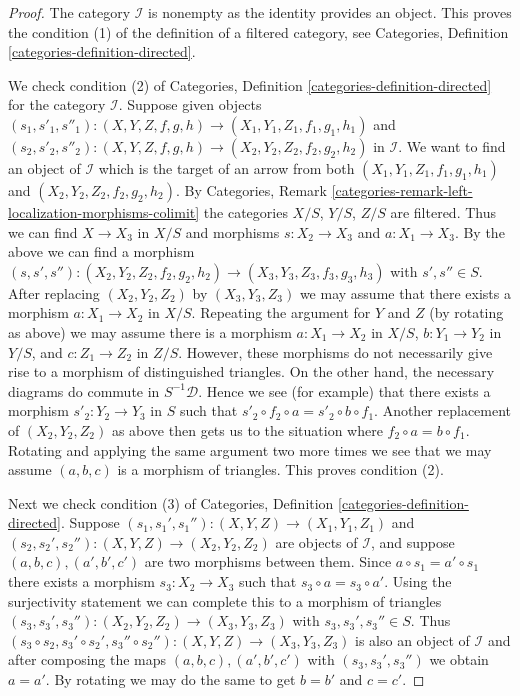 \begin{proof}
\medskip\noindent
The category $\mathcal{I}$ is nonempty as the identity provides an object.
This proves the condition (1) of the definition of a filtered category, see
Categories, Definition \ref{categories-definition-directed}.

\medskip\noindent
We check condition (2) of
Categories, Definition \ref{categories-definition-directed}
for the category $\mathcal{I}$. Suppose given objects
$(s_1, s'_1, s''_1) : (X, Y, Z, f, g, h) \to (X_1, Y_1, Z_1, f_1, g_1, h_1)$
and
$(s_2, s'_2, s''_2) : (X, Y, Z, f, g, h) \to (X_2, Y_2, Z_2, f_2, g_2, h_2)$
in $\mathcal{I}$. We want to find an object of $\mathcal{I}$
which is the target of an arrow from both
$(X_1, Y_1, Z_1, f_1, g_1, h_1)$ and $(X_2, Y_2, Z_2, f_2, g_2, h_2)$.
By Categories, Remark
\ref{categories-remark-left-localization-morphisms-colimit}
the categories $X/S$, $Y/S$, $Z/S$ are filtered.
Thus we can find $X \to X_3$ in $X/S$ and morphisms
$s : X_2 \to X_3$ and $a : X_1 \to X_3$. By the above we can find a morphism
$(s, s', s'') : (X_2, Y_2, Z_2, f_2, g_2, h_2) \to
(X_3, Y_3, Z_3, f_3, g_3, h_3)$ with $s', s'' \in S$.
After replacing $(X_2, Y_2, Z_2)$ by $(X_3, Y_3, Z_3)$ we may
assume that there exists a morphism $a : X_1 \to X_2$ in $X/S$.
Repeating the argument for $Y$ and $Z$ (by rotating as above)
we may assume there is a morphism
$a : X_1 \to X_2$ in $X/S$,
$b : Y_1 \to Y_2$ in $Y/S$, and
$c : Z_1 \to Z_2$ in $Z/S$.
However, these morphisms do not necessarily give rise to a morphism of
distinguished triangles. On the other hand, the necessary diagrams
do commute in $S^{-1}\mathcal{D}$. Hence we see (for example) that
there exists a morphism $s'_2 : Y_2 \to Y_3$ in $S$ such that
$s'_2 \circ f_2 \circ a = s'_2 \circ b \circ f_1$. Another replacement
of $(X_2, Y_2, Z_2)$ as above then gets us to the situation where
$f_2 \circ a = b \circ f_1$. Rotating and applying the same argument
two more times we see that we may assume $(a, b, c)$ is a morphism
of triangles. This proves condition (2).

\medskip\noindent
Next we check condition (3) of
Categories, Definition \ref{categories-definition-directed}.
Suppose $(s_1, s_1', s_1'') : (X, Y, Z) \to (X_1, Y_1, Z_1)$ and
$(s_2, s_2', s_2'') : (X, Y, Z) \to (X_2, Y_2, Z_2)$
are objects of $\mathcal{I}$, and suppose $(a, b, c), (a', b', c')$
are two morphisms between them. Since $a \circ s_1 = a' \circ s_1$
there exists a morphism $s_3 : X_2 \to X_3$ such that
$s_3 \circ a = s_3 \circ a'$. Using the surjectivity statement
we can complete this to a morphism of triangles
$(s_3, s_3', s_3'') : (X_2, Y_2, Z_2) \to (X_3, Y_3, Z_3)$
with $s_3, s_3', s_3'' \in S$. Thus
$(s_3 \circ s_2, s_3' \circ s_2', s_3'' \circ s_2'') :
(X, Y, Z) \to (X_3, Y_3, Z_3)$ is also an object of $\mathcal{I}$
and after composing the maps $(a, b, c), (a', b', c')$ with
$(s_3, s_3', s_3'')$ we obtain $a = a'$. By rotating we may do the
same to get $b = b'$ and $c = c'$.


\end{proof}
